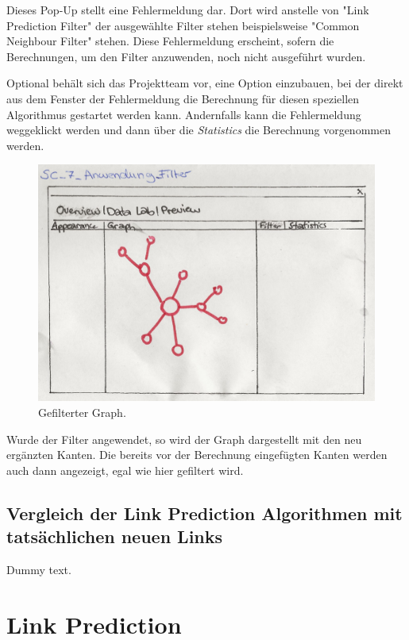 Dieses Pop-Up stellt eine Fehlermeldung dar. Dort wird anstelle von "Link Prediction Filter" der ausgewählte Filter
stehen beispielsweise "Common Neighbour Filter" stehen. Diese Fehlermeldung erscheint, sofern die Berechnungen, um den
Filter anzuwenden, noch nicht ausgeführt wurden.

Optional behält sich das Projektteam vor, eine Option einzubauen, bei der direkt aus dem Fenster der Fehlermeldung die
Berechnung für diesen speziellen Algorithmus gestartet werden kann. Andernfalls kann die Fehlermeldung weggeklickt
werden und dann über die \textit{Statistics} die Berechnung vorgenommen werden.

\begin{figure}[htbp]
    \includegraphics[width=\linewidth]{resources/SC-7.png}
    \caption{Gefilterter Graph.}
    \label{fig:screen7}
\end{figure}

Wurde der Filter angewendet, so wird der Graph dargestellt mit den neu ergänzten Kanten. Die bereits vor der Berechnung
eingefügten Kanten werden auch dann angezeigt, egal wie hier gefiltert wird.

\subsection{Vergleich der Link Prediction Algorithmen mit tatsächlichen neuen Links}

Dummy text.

\section{Link Prediction}

